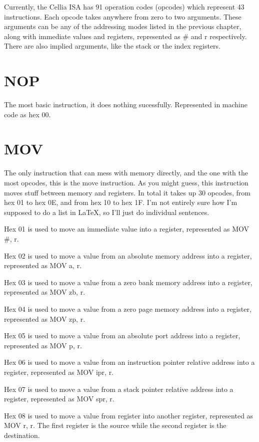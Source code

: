 \documentclass[letterpaper,12pt]{book}
\begin{document}
Currently, the Cellia ISA has 91 operation codes (opcodes) which represent 43 instructions. Each opcode takes anywhere from zero to two arguments. These arguments can be any of the addressing modes listed in the previous chapter, along with immediate values and registers, represented as \# and r respectively. There are also implied arguments, like the stack or the index registers.

\section{NOP}

The most basic instruction, it does nothing sucessfully. Represented in machine code as hex 00.

\section{MOV}

The only instruction that can mess with memory directly, and the one with the most opcodes, this is the move instruction. As you might guess, this instruction moves stuff between memory and registers. In total it takes up 30 opcodes, from hex 01 to hex 0E, and from hex 10 to hex 1F. I'm not entirely sure how I'm supposed to do a list in \LaTeX, so I'll just do individual sentences.

Hex 01 is used to move an immediate value into a register, represented as MOV \#, r.

Hex 02 is used to move a value from an absolute memory address into a register, represented as MOV a, r.

Hex 03 is used to move a value from a zero bank memory address into a register, represented as MOV zb, r.

Hex 04 is used to move a value from a zero page memory address into a register, represented as MOV zp, r.

Hex 05 is used to move a value from an absolute port address into a register, represented as MOV p, r.

Hex 06 is used to move a value from an instruction pointer relative address into a register, represented as MOV ipr, r.

Hex 07 is used to move a value from a stack pointer relative address into a register, represented as MOV spr, r.

Hex 08 is used to move a value from register into another register, represented as MOV r, r. The first register is the source while the second register is the destination.
\end{document}
